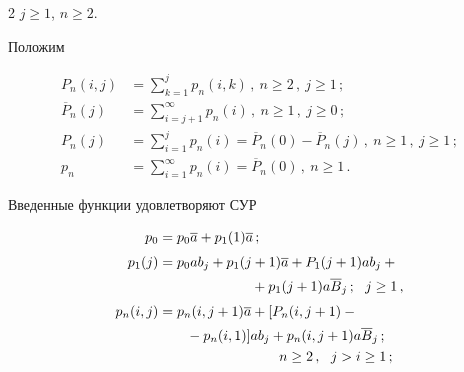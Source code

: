 \begin{multicols}{2}
$j\ge 1$, $n\ge 2$.





Положим


\begin{align*}


P_{n}(i,j) &= \sum\limits_{k=1}^j


p_{n}(i,k)\,,  \ n\ge 2\,,\  j\ge 1\,;\\[2pt]


\overline P_{n}(j) &=  \sum\limits_{i=j+1}^\infty p_{n}(i)\,,


\  n\ge 1\,,\  j\ge 0\,;\\[2pt]


P_{n}(j) & =  \sum\limits_{i=1}^j


p_{n}(i) = \overline P_{n}(0) - \overline P_{n}(j)\,,


\  n\ge 1\,,\  j\ge 1\,;\\[2pt]


p_{n} & = \sum\limits_{i=1}^\infty


p_{n}(i)  = \overline P_{n}(0)\,,


 \ n\ge 1\,.


\end{align*}





Введенные функции удовлетворяют СУР


\begin{align}


p_{0} &= p_{0} \a + p_{1}(1) \a\,;\label{e25p}\\[3pt]


p_{1}(j) &  = p_{0} a b_j + p_{1}(j+1) \a + P_{1}(j+1) a b_j +{}\notag\\[1pt]


&\hspace*{40pt}\ \ \ \ \ \ \ \ {}+


p_{1}(j+1) a \overline B_j\,;  \ \ j\ge 1\,,\label{e26p}\\[3pt]


p_{n}(i,j) & = p_{n}(i,j+1) \a + [P_n(i,j+1) -{}\notag\\[1pt]


&\hspace*{20pt}{}- p_{n}(i,1)] a b_j  +


p_{n}(i,j+1) a \overline B_j\,;\notag\\


&\hspace*{40pt}\ \ \ \ \ \ \ \ \ \ \ \ \ \ n\ge 2\,,\ \ j>i\ge 1\,;\label{e27p}\\[3pt]



\end{align}
\end{multicols}
